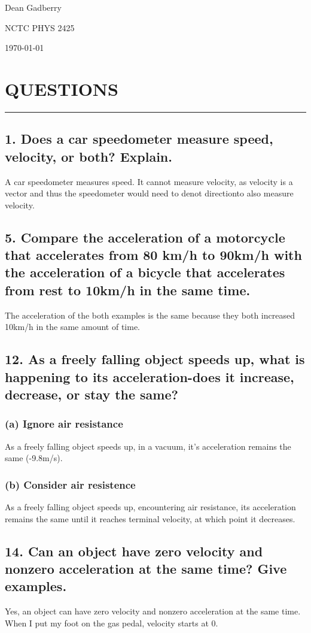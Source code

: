 \documentclass[12pt,a4paper,english]{article}
\begin{document}
\begin{flushleft}
    Dean Gadberry

    NCTC PHYS 2425

    \today

    \section*{QUESTIONS}
      \hrule
      \subsection{1. Does a car speedometer measure speed, velocity, or both? Explain.}
        A car speedometer measures speed. It cannot measure velocity, as velocity is a vector and thus the speedometer would need to denot directionto also measure velocity.
      \subsection{5. Compare the acceleration of a motorcycle that accelerates from 80 km/h to 90km/h with the acceleration of a bicycle that accelerates from rest to 10km/h in the same time.}
        The acceleration of the both examples is the same because they both increased 10km/h in the same amount of time.
      \subsection{12. As a freely falling object speeds up, what is happening to its acceleration-does it increase, decrease, or stay the same?}
        \subsubsection{(a) Ignore air resistance}
        As a freely falling object speeds up, in a vacuum, it's acceleration remains the same (-9.8m/s).
        \subsubsection{(b) Consider air resistence}
        As a freely falling object speeds up, encountering air resistance, its acceleration remains the same until it reaches terminal velocity, at which point it decreases.
      \subsection{14. Can an object have zero velocity and nonzero acceleration at the same time? Give examples.}
      Yes, an object can have zero velocity and nonzero acceleration at the same time. When I put my foot on the gas pedal, velocity starts at 0.

\end{flushleft}
\end{document}
